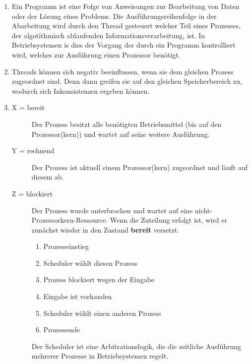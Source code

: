 \documentclass[ngerman]{fbi-aufgabenblatt}
\begin{document}
\begin{enumerate}
	\item Ein Programm ist eine Folge von Anweisungen zur Bearbeitung von Daten oder der Lösung eines Problems. Die Ausführungsreihenfolge in der Abarbeitung wird durch den Thread gesteuert welcher Teil eines Prozesses, der algotithmisch ablaufenden Informationsverarbeitung, ist. In Betriebsystemen is dies der Vorgang der durch ein Programm kontrolliert wird, welches zur Ausführung einen Prozessor benötigt.
	\item Threads können sich negativ beeinflussen, wenn sie dem gleichen Prozess zugeordnet sind. Denn dann greifen sie auf den gleichen Speicherbereich zu, wodurch sich Inkonsistenzen ergeben können.
	\setcounter{enumi}{3}
	\item 
	\begin{description} 
		\item[X = bereit] Der Prozess besitzt alle benötigten Betriebsmittel (bis auf den Prozessor(kern)) und wartet auf seine weitere Ausführung.
		\item[Y = rechnend] Der Prozess ist aktuell einem Prozessor(kern) zugeordnet und läuft auf diesem ab.
		\item[Z = blockiert] Der Prozess wurde unterbrochen und wartet auf eine nicht-Prozessorkern-Ressource. Wenn die Zuteilung erfolgt ist, wird er zunächst wieder in den Zustand \textbf{bereit} versetzt.
		\renewcommand{\theenumii}{\alph{enumii} =}
		\begin{enumerate}
   			\item Prozesseinstieg
   			\item Scheduler wählt diesen Prozess
   			\item Prozess blockiert wegen der Eingabe
   			\item Eingabe ist vorhanden
   			\item Scheduler wählt einen anderen Prozess
   			\item Prozessende
   		\end{enumerate}
	Der Scheduler ist eine Arbitrationslogik, die die zeitliche Ausführung mehrerer Prozesse in Betriebsystemen regelt.
	\end{description}
\end{enumerate}
%

\end{document}
